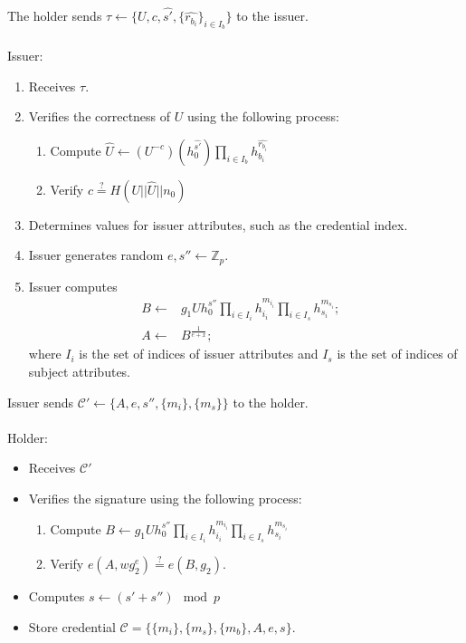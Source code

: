\documentclass[a4paper]{article}
\begin{document}
The holder sends $\tau \leftarrow
\{U, c, \widehat{s'}, \{\widehat{r_{b_i}}\}_{i \in I_b}\}$ to the issuer.\\\\
Issuer:
\begin{enumerate}
    \item Receives $\tau$.
    \item Verifies the correctness of $U$ using the following process:
    \begin{enumerate}
        \item Compute
        $\widehat{U} \leftarrow (U^{-c}) (h_0^{\widehat{s'}}) \prod_{i \in I_b}{h_{b_i}^{\widehat{r_{b_i}}}}$
        \item Verify
        $c\overset{\text{?}}{=} H(U||\widehat{U}||n_0)$
    \end{enumerate}
    \item Determines values for issuer attributes, such as the credential index.
    \item Issuer generates random $e,s''\leftarrow \mathbb{Z}_p$.
    \item Issuer computes
    \begin{align}
    B \leftarrow&g_1 U h_0^{s''}\prod_{i\in I_i} h_{i_i}^{m_{i_i}}\prod_{i\in I_s} h_{s_i}^{m_{s_i}};&\\
    A \leftarrow&B^{\frac{1}{e+x}};
    \end{align}
    where $I_i$ is the set of indices of issuer attributes and $I_s$ is the set of indices of subject attributes.
    \end{enumerate}
    
Issuer sends $\mathcal{C}' \leftarrow \{A,e,s'',\{m_i\},\{m_s\}\}$ to the holder.\\\\
Holder:
\begin{itemize}
    \item Receives $\mathcal{C}'$
    \item Verifies the signature using the following process:
    \begin{enumerate}
        \item Compute $B\leftarrow g_1U h_0^{s''} \prod_{i\in I_i} h_{i_i}^{m_{i_i}}\prod_{i\in I_s} h_{s_i}^{m_{s_i}}$
        \item Verify $e(A,wg_2^{e})\overset{\text{?}}{=}e(B,g_2)$.
    \end{enumerate}
    \item Computes $s \leftarrow (s' + s'') \mod{p}$
    \item Store credential $\mathcal{C} = \{\{m_i\}, \{m_s\}, \{m_b\},A,e,s\}$.
\end{itemize}
\end{document}
